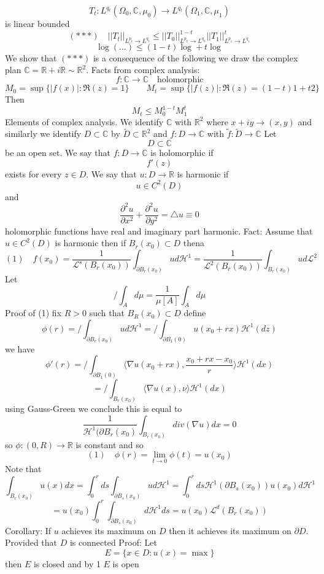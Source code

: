 \documentclass[11pt]{article}
\begin{document}
\[
T_t : L^{q_t}(\Omega_0, \mathbb{C}, \mu_0) \to L^{q_t}(\Omega_1, \mathbb{C}, \mu_1)
\] 
is linear bounded
\[
    (***) \quad    ||T_t||_{L^{p_t} \to L^{q_t}} \le ||T_0||_{L^{p_0}\to L^{q_0}}^{1-t}||T_1||_{L^{p_1} \to L^{q_1}}^{t}
\] 
\[
\log(\dots) \le (1-t)\log + t\log
\] 
We show that $(***)$ is a consequence of the following
we draw the complex plan  $ \mathbb{C} = \mathbb{R} + i \mathbb{R} \sim \mathbb{R}^2$.
Facts from complex analysis:
\[
    f: \mathbb{C} \to \mathbb{C} \quad \text{holomorphic}
\] 
\[
    M_0 = \sup\{|f(x)| : \Re(z) = 1\} \qquad M_t = \sup\{|f(z)| : \Re(z) = (1-t)1 + t2\}
\] 
Then
\[
M_t \le M_0^{1-t}M_1^{t}
\] 
Elements of complex analysis.
We identify $ \mathbb{C}$ with $ \mathbb{R}^2$ where $x +iy \to(x,y)$
and similarly we identify  $D \subset \mathbb{C}$ by $\tilde D \subset \mathbb{R}^2$
and $f : D \to \mathbb{C}$ with $\tilde f : \tilde  D \to \mathbb{C}$
Let
\[
D \subset \mathbb{C}
\] 
be an open set.
We say that $f : D \to \mathbb{C}$ is holomorphic if
\[
f'(z) 
\] 
exists for every $z \in D$.
We say that  $u : D \to \mathbb{R}$ is harmonic if
\[
u \in C^2( D)
\] 
and
\[
\frac{\partial^2 u}{ \partial x^2} + \frac{\partial^2 u}{ \partial y^2} = \triangle u \equiv 0
\] 
holomorphic functions have real and imaginary part harmonic.
Fact: Assume that $u \in C^2(D)$ is harmonic
then if $B_r(x_0) \subset D$ thena
\[
    (1) \quad   f(x_0) = \frac{1}{ \mathcal{L}^{s}(B_r(x_0))}\int_{\partial B_r(x_0)}^{} u d \mathcal{H}^{1} =  \frac{1}{ \mathcal{L}^{2}(B_r(x_0))} \int_{B_r(x_0)}^{}u d \mathcal{L}^2
\] 
Let
\[
    / \int_{A}^{}d\mu = \frac{1}{\mu[A]} \int_{A}^{}d \mu
\] 
Proof of (1) fix  $R > 0$ such that  $B_R(x_0) \subset D$
define
\[
    \phi(r) = / \int_{\partial B_r(x_0)}^{} u d \mathcal{H}^{1} = / \int_{ \partial B_1(0)}^{}u(x_0 + rx) \mathcal{H}^{1}(dz)
\] 
we have
\[
    \phi'(r) = / \int_{\partial B_1(0)}^{} \langle \nabla u(x_0 + rx), \frac{x_0 + rx - x_0}{r} \rangle \mathcal{H}^{1}(dx)
\] 
\[
    = / \int_{B_r(x_0)}^{} \langle \nabla u(x), \nu \rangle \mathcal{H}^{1}(dx)
\] 
using Gauss-Green we conclude this is equal to 
\[
    \frac{1}{\mathcal{H}^{1}(\partial B_r(x_0)} \int_{B_r(x_0)}^{} div(\nabla u) dx = 0
\] 
so $\phi : (0, R) \to \mathbb{R}$ is constant and so 
\[
    (1) \quad \phi(r) = \lim_{t\to 0}\phi(t) = u(x_0)
\] 
Note that
\[
    \int_{B_r(x_0)}^{}u(x)dx = \int_{0}^{r}ds \int_{\partial B_s(x_0)}^{}u d \mathcal{H}^{1} = \int_{0}^{r}ds \mathcal{H}^{1}(\partial B_s(x_0)) u(x_0) d \mathcal{H}^{1}
\] 
\[
    = u(x_0) \int_{ 0}^{r}\int_{\partial B_s(x_0)}^{}d\mathcal{H}^{1}ds =  u(x_0) \mathcal{L}^{d}(B_r(x_{0}))
\] 
Corollary:
If $u$ achieves its maximum on  $D$ then it achieves its maximum on  $\partial D$.
Provided that  $D$ is connected
Proof:
Let 
\[
    E = \{x \in D: u(x) = \max\}
\] 
then $E$ is closed and by 1  $E$ is open
\end{document}

